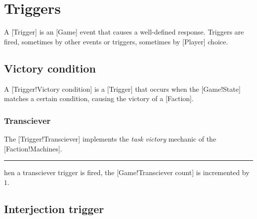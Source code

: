 \chapter{Triggers}

A [Trigger] is an [Game] event that causes a well-defined response.
Triggers are fired, sometimes by other events or triggers, sometimes by [Player] choice.

\section{Victory condition}

A [Trigger!Victory condition] is a [Trigger] that occurs when the [Game!State] matches a certain condition, causing the victory of a [Faction].


\subsection{Transciever}

The [Trigger!Transciever] implements the \emph{task victory} mechanic of the [Faction!Machines].

\begin{rules}
    \rule{trigger.transciever} When a transciever trigger is fired, the [Game!Transciever count] is incremented by \(1\).
\end{rules}

\section{Interjection trigger}

